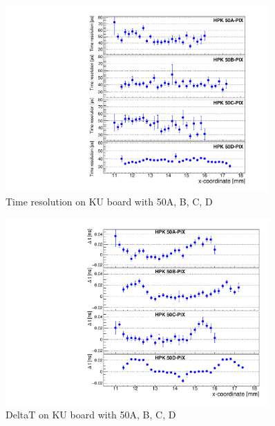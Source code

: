 \documentclass[preprint,1p]{elsarticle}
\begin{document}
\begin{figure}[htbp] 
\centering
\includegraphics[width=0.9\textwidth]{figs/KUBoard_HPK50ABCD/KUBoard_50ABCD_TimeResolution.pdf} 
\caption{Time resolution on KU board with 50A, B, C, D } 
\label{fig:Sensors} 
\end{figure} 

\begin{figure}[htbp] 
\centering
\includegraphics[width=0.9\textwidth]{figs/KUBoard_HPK50ABCD/KUBoard_50ABCD_MeanTime.pdf} 
\caption{DeltaT on KU board with 50A, B, C, D } 
\label{fig:Sensors} 
\end{figure} 
\end{document}
